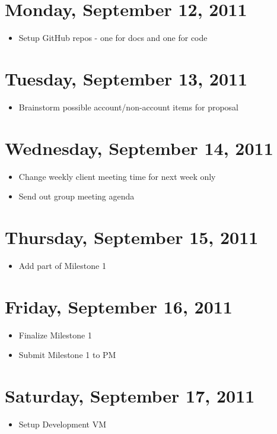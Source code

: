 \documentclass{article}
\begin{document}
\section{Monday, September 12, 2011}
\begin{itemize}
\item Setup GitHub repos - one for docs and one for code
\end{itemize}

\section{Tuesday, September 13, 2011}
\begin{itemize}
\item Brainstorm possible account/non-account items for proposal
\end{itemize}

\section{Wednesday, September 14, 2011}
\begin{itemize}
\item Change weekly client meeting time for next week only
\item Send out group meeting agenda
\end{itemize}

\section{Thursday, September 15, 2011}
\begin{itemize}
\item Add part of Milestone 1
\end{itemize}

\section{Friday, September 16, 2011}
\begin{itemize}
\item Finalize Milestone 1
\item Submit Milestone 1 to PM
\end{itemize}

\section{Saturday, September 17, 2011}
\begin{itemize}
\item Setup Development VM
\end{itemize}
\end{document}
